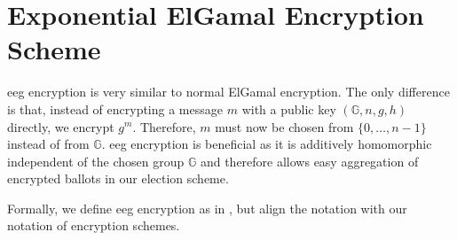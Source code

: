 \section{Exponential ElGamal Encryption Scheme}
\gls{eeg} encryption is very similar to normal ElGamal encryption.
The only difference is that, instead of encrypting a message $m$ with a public key $(\mathbb{G}, n, g, h)$ directly, we encrypt $g^m$.
Therefore, $m$ must now be chosen from $\{0,\dots, n-1\}$ instead of from $\mathbb{G}$.
\gls{eeg} encryption is beneficial as it is additively homomorphic independent of the chosen group $\mathbb{G}$ and therefore allows easy aggregation of encrypted ballots in our election scheme.

Formally, we define \gls{eeg} encryption as in \cite{aldini_cryptographic_2014}, but align the notation with our notation of encryption schemes.

